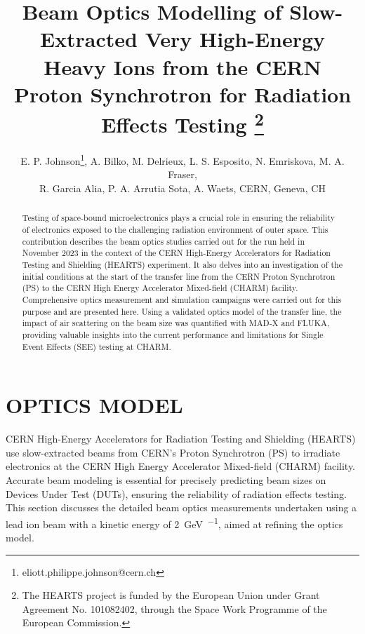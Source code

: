 \documentclass[a4paper,
               biblatex,     %
               ]{jacow}
\begin{document}
\title{Beam Optics Modelling of Slow-Extracted Very High-Energy Heavy Ions from the CERN Proton Synchrotron for Radiation Effects Testing \thanks{The HEARTS project is funded by the European Union under Grant Agreement No. 101082402, through the Space Work Programme of the European Commission.}}

\author{E. P. Johnson\thanks{eliott.philippe.johnson@cern.ch},
    A. Bilko, 
    M. Delrieux, 
    L. S. Esposito, 
    N. Emriskova, 
    M. A. Fraser,\\ 
    R. Garcia Alia,
    P. A. Arrutia Sota, 
    A. Waets, CERN, Geneva, CH}
	
\maketitle

%
\begin{abstract}
   Testing of space-bound microelectronics plays a crucial role in ensuring the reliability of electronics exposed to the challenging radiation environment of outer space. This contribution describes the beam optics studies carried out for the run held in November 2023 in the context of the CERN High-Energy Accelerators for Radiation Testing and Shielding (HEARTS) experiment. It also delves into an investigation of the initial conditions at the start of the transfer line from the CERN Proton Synchrotron (PS) to the CERN High Energy Accelerator Mixed-field (CHARM) facility. Comprehensive optics measurement and simulation campaigns were carried out for this purpose and are presented here. Using a validated optics model of the transfer line, the impact of air scattering on the beam size was quantified with MAD-X and FLUKA, providing valuable insights into the current performance and limitations for Single Event Effects (SEE) testing at CHARM.
\end{abstract}







\section{OPTICS MODEL}

CERN High-Energy Accelerators for Radiation Testing and Shielding (HEARTS) \cite{noauthor_hearts_nodate} use slow-extracted beams from CERN's Proton Synchrotron (PS) to irradiate electronics at the CERN High Energy Accelerator Mixed-field (CHARM) facility. Accurate beam modeling is essential for precisely predicting beam sizes on Devices Under Test (DUTs), ensuring the reliability of radiation effects testing. This section discusses the detailed beam optics measurements undertaken using a lead ion beam with a kinetic energy of \SI{2}{\giga\electronvolt\per\nucleon}, aimed at refining the optics model. 
\end{document}
